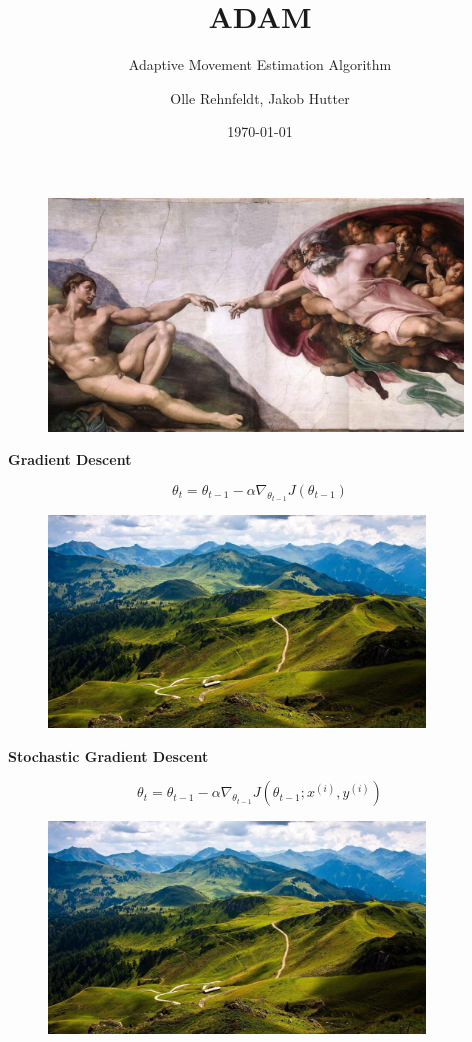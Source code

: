 \documentclass{beamer}
\author{Olle Rehnfeldt, Jakob Hutter}
\title{ADAM}
\subtitle{Adaptive Movement Estimation Algorithm}
\institute{Data Science and Society}
\date{\today}
\newcommand\myheading[1]{%
  \par\bigskip
  {\Large\bfseries#1}\par\smallskip}
\begin{document}
\begin{frame}
    \begin{figure}[h]
        \includegraphics[width=11cm]{presentation/ADAMS/historical.jpg}
    \end{figure}
\end{frame}


\begin{frame}
    \titlepage
\end{frame}


\begin{frame}
    \myheading{Gradient Descent}
    $$\theta_t = \theta_{t-1} - \alpha \nabla_{\theta_{t-1}} J(\theta_{t-1})$$
    \begin{figure}[h]
        \includegraphics[width=10cm]{presentation/ADAMS/topology.jpg}
    \end{figure}
\end{frame}


\begin{frame}
    \myheading{Stochastic Gradient Descent}
    $$\theta_t = \theta_{t-1} - \alpha \nabla_{\theta_{t-1}} J(\theta_{t-1}; x^{(i)}, y^{(i)})$$
    \begin{figure}[h]
        \includegraphics[width=10cm]{presentation/ADAMS/topology.jpg}
    \end{figure}
\end{frame}
\end{document}

